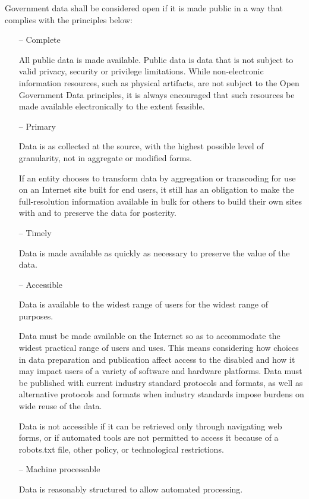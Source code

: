 \documentclass[12pt,a4paper,titlepage]{article}
\begin{document}
Government data shall be considered open if it is made public in a way that complies with the principles below:
\begin{itemize}
\item[--] Complete

All public data is made available. Public data is data that is not subject to valid privacy, security or privilege limitations.
While non-electronic information resources, such as physical artifacts, are not subject to the Open Government Data principles, it is always encouraged that such resources be made available electronically to the extent feasible.

\item[--] Primary

Data is as collected at the source, with the highest possible level of granularity, not in aggregate or modified forms.

If an entity chooses to transform data by aggregation or transcoding for use on an Internet site built for end users, it still has an obligation to make the full-resolution information available in bulk for others to build their own sites with and to preserve the data for posterity.

\item[--] Timely

Data is made available as quickly as necessary to preserve the value of the data.

\item[--] Accessible

Data is available to the widest range of users for the widest range of purposes.

Data must be made available on the Internet so as to accommodate the widest practical range of users and uses. This means considering how choices in data preparation and publication affect access to the disabled and how it may impact users of a variety of software and hardware platforms. Data must be published with current industry standard protocols and formats, as well as alternative protocols and formats when industry standards impose burdens on wide reuse of the data.

Data is not accessible if it can be retrieved only through navigating web forms, or if automated tools are not permitted to access it because of a robots.txt file, other policy, or technological restrictions.

\item[--] Machine processable

Data is reasonably structured to allow automated processing.


\end{itemize}
\end{document}
